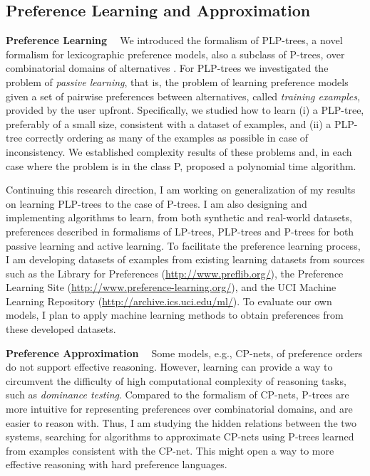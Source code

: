 \documentclass[11pt]{article}
\begin{document}
\subsection{Preference Learning and Approximation}
\smallskip \noindent \textbf{Preference Learning \ }
We introduced the formalism of PLP-trees, a novel formalism for lexicographic preference models,
also a subclass of P-trees, over combinatorial domains of alternatives \cite{LiuT:Learn_PLPTrees}.
For PLP-trees we investigated the problem of \textit{passive learning},
that is, the problem of learning preference models given a set of
pairwise preferences between alternatives, called \textit{training examples}, provided by the user upfront.
Specifically, we studied how to learn (i) a PLP-tree, preferably of a small size, 
consistent with a dataset of examples, and (ii) a PLP-tree correctly
ordering as many of the examples as possible in case
of inconsistency. We established complexity results
of these problems and, in each case where the problem
is in the class P, proposed a polynomial time algorithm.

Continuing this research direction,
I am working on generalization of my results on learning PLP-trees to the case of P-trees.
I am also designing and implementing algorithms to learn, from both synthetic and real-world datasets, preferences
described in formalisms
of LP-trees, PLP-trees and P-trees for both passive learning and active learning.
To facilitate the preference learning process, I am developing datasets of examples from existing
learning datasets from sources such as the Library for Preferences (\url{http://www.preflib.org/}),
the Preference Learning Site (\url{http://www.preference-learning.org/}), 
and the UCI Machine Learning Repository (\url{http://archive.ics.uci.edu/ml/}).
To evaluate our own models, I plan to
apply machine learning methods to obtain preferences from these developed datasets.

\smallskip \noindent \textbf{Preference Approximation \ }
Some models, e.g., CP-nets, of preference orders do not support effective reasoning.
However, learning can provide a way to circumvent the difficulty of high computational complexity
of reasoning tasks, such as \textit{dominance testing}.
Compared to the formalism of CP-nets, P-trees are more intuitive
for representing preferences over combinatorial domains, and are easier to reason with.
Thus, I am studying the hidden relations between the two systems, searching for 
algorithms to approximate
CP-nets using P-trees learned from examples consistent with the CP-net.
This might open a way to more effective reasoning with hard preference languages.
\end{document}

